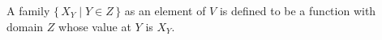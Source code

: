 A family $\{\, X_Y \mid Y \in Z \,\}$ as an element of $V$ is defined to be a function with domain $Z$ whose value at $Y$ is $X_Y$.
